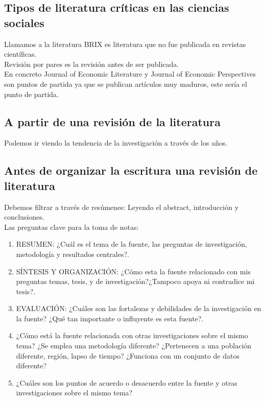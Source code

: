 \subsection*{Tipos de literatura críticas en las ciencias sociales}
Llamamos a la literatura BRIX es literatura que no fue publicada en revistas científicas. \\
Revisión por pares es la revisión antes de ser publicada.\\

En concreto Journal of Economic Literature y Journal of Economic Perspectives son puntos de partida ya que se publican artículos muy maduros, este sería el punto de partida.

\subsection{A partir de una revisión de la literatura}
Podemos ir viendo la tendencia de la investigación a través de los años.

\subsection{Antes de organizar la escritura una revisión de literatura}
Debemos filtrar a través de resúmenes: Leyendo el abstract, introducción y conclusiones.\\

Las preguntas clave para la toma de notas:
\begin{enumerate}[1.]
    \item RESUMEN: ¿Cuál es el tema de la fuente, las preguntas de investigación, metodología y resultados centrales?.
    \item SÍNTESIS Y ORGANIZACIÓN: ¿Cómo esta la fuente relacionado con mis preguntas temas, tesis, y de investigación?¿Tampoco apoya ni contradice mi tesis?.
    \item EVALUACIÓN: ¿Cuáles son las fortalezas y debilidades de la investigación en la fuente? ¿Qué tan importante o influyente es esta fuente?.
    \item ¿Cómo está la fuente relacionada con otras investigaciones sobre el mismo tema? ¿Se emplea una metodología diferente? ¿Pertenecen a una población diferente, región, lapso de tiempo? ¿Funciona con un conjunto de datos diferente?
    \item ¿Cuáles son los puntos de acuerdo o desacuerdo entre la fuente y otras investigaciones sobre el mismo tema?
\end{enumerate}


